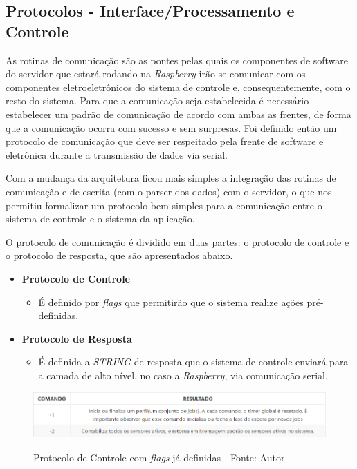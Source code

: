\subsection*{\textbf{Protocolos - Interface/Processamento e Controle}} \label{software:protocolo}

As rotinas de comunicação são as pontes pelas quais os componentes de software do servidor que estará rodando na \textit{Raspberry} irão se
comunicar com os componentes eletroeletrônicos do sistema de controle e, consequentemente, com o resto do sistema. 
Para que a comunicação seja estabelecida é necessário estabelecer um padrão de comunicação de acordo com ambas as frentes, de forma que a comunicação 
ocorra com sucesso e sem surpresas. Foi definido então um protocolo de comunicação que deve ser respeitado pela frente de software e
eletrônica durante a transmissão de dados via serial.

Com a mudança da arquitetura ficou mais simples a integração das rotinas de comunicação e de escrita (com o parser dos dados)
com o
servidor, o que nos permitiu formalizar um protocolo bem simples para a comunicação entre o sistema de controle e o 
sistema da aplicação.

O protocolo de comunicação é dividido em duas partes: o protocolo de controle e o protocolo de resposta, que são apresentados 
abaixo.

\begin{itemize}
    \item \textbf{Protocolo de Controle}
    \begin{itemize}
        \item É definido por \textit{flags} que permitirão que o sistema realize ações pré-definidas.
    \end{itemize}
    \item \textbf{Protocolo de Resposta}
    \begin{itemize}
        \item É definida a \textit{STRING} de resposta que o sistema de controle enviará para a camada de alto nível, no caso a \textit{Raspberry}, via 
        comunicação serial.
    \end{itemize}
\end{itemize}

\begin{figure}[H]
\centering
\includegraphics[keepaspectratio=true,scale=0.7]{figuras/protocolo_controle.png}
\label{fig:protocolo_controle}
\caption{Protocolo de Controle com \textit{flags} já definidas - Fonte: Autor}
\end{figure}

